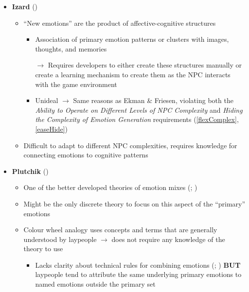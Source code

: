 \begin{itemize}
    \item \textbf{Izard} (\disqualified)
    \begin{itemize}
        \item ``New emotions'' are the product of affective-cognitive
        structures~\citep[p.~564--565]{izard1992basic}
        \begin{itemize}
            \item Association of primary emotion patterns or clusters with
            images, thoughts, and memories

            \item [$\rightarrow$] Requires developers to either create these
            structures manually or create a learning mechanism to create them
            as the NPC interacts with the game environment

            \item Unideal $\rightarrow$ Same reasons as Ekman \& Friesen,
            violating both the \textit{Ability to Operate on Different Levels
                of NPC Complexity} and \textit{Hiding the Complexity of Emotion
                Generation} requirements (\ref{flexComplex}, \ref{easeHide})
        \end{itemize}

        \item Difficult to adapt to different NPC complexities, requires
        knowledge for connecting emotions to cognitive patterns
    \end{itemize}

    \item \textbf{Plutchik} (\strong)
    \begin{itemize}
        \item One of the better developed theories of emotion mixes
        (; )

        \item Might be the only discrete theory to focus on this aspect of the
        ``primary'' emotions~\citep[p.~47]{ekman1999basic}

        \item Colour wheel analogy uses concepts and terms that are generally
        understood by laypeople $\rightarrow$ does not require any knowledge of
        the theory to use
        \begin{itemize}
            \item Lacks clarity about technical rules for combining emotions
            (; )
            \textbf{BUT} laypeople tend to attribute the same underlying
            primary emotions to named emotions outside the primary
            set~\citep[p.~204--205]{plutchik1984emotions}


\end{itemize}
\end{itemize}
\end{itemize}
